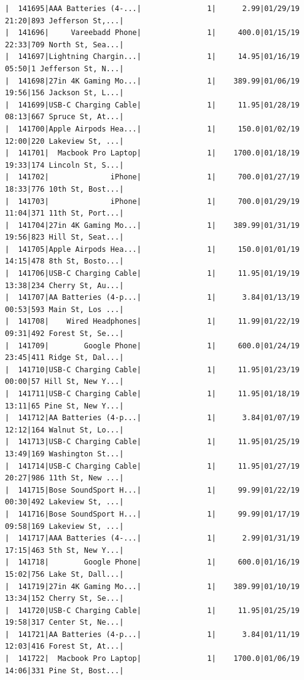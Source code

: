 \documentclass[
  letterpaper,
  DIV=11,
  numbers=noendperiod]{scrartcl}
\begin{document}
\begin{verbatim}
|  141695|AAA Batteries (4-...|               1|      2.99|01/29/19 21:20|893 Jefferson St,...|
|  141696|     Vareebadd Phone|               1|     400.0|01/15/19 22:33|709 North St, Sea...|
|  141697|Lightning Chargin...|               1|     14.95|01/16/19 05:50|1 Jefferson St, N...|
|  141698|27in 4K Gaming Mo...|               1|    389.99|01/06/19 19:56|156 Jackson St, L...|
|  141699|USB-C Charging Cable|               1|     11.95|01/28/19 08:13|667 Spruce St, At...|
|  141700|Apple Airpods Hea...|               1|     150.0|01/02/19 12:00|220 Lakeview St, ...|
|  141701|  Macbook Pro Laptop|               1|    1700.0|01/18/19 19:33|174 Lincoln St, S...|
|  141702|              iPhone|               1|     700.0|01/27/19 18:33|776 10th St, Bost...|
|  141703|              iPhone|               1|     700.0|01/29/19 11:04|371 11th St, Port...|
|  141704|27in 4K Gaming Mo...|               1|    389.99|01/31/19 19:56|823 Hill St, Seat...|
|  141705|Apple Airpods Hea...|               1|     150.0|01/01/19 14:15|478 8th St, Bosto...|
|  141706|USB-C Charging Cable|               1|     11.95|01/19/19 13:38|234 Cherry St, Au...|
|  141707|AA Batteries (4-p...|               1|      3.84|01/13/19 00:53|593 Main St, Los ...|
|  141708|    Wired Headphones|               1|     11.99|01/22/19 09:31|492 Forest St, Se...|
|  141709|        Google Phone|               1|     600.0|01/24/19 23:45|411 Ridge St, Dal...|
|  141710|USB-C Charging Cable|               1|     11.95|01/23/19 00:00|57 Hill St, New Y...|
|  141711|USB-C Charging Cable|               1|     11.95|01/18/19 13:11|65 Pine St, New Y...|
|  141712|AA Batteries (4-p...|               1|      3.84|01/07/19 12:12|164 Walnut St, Lo...|
|  141713|USB-C Charging Cable|               1|     11.95|01/25/19 13:49|169 Washington St...|
|  141714|USB-C Charging Cable|               1|     11.95|01/27/19 20:27|986 11th St, New ...|
|  141715|Bose SoundSport H...|               1|     99.99|01/22/19 00:30|492 Lakeview St, ...|
|  141716|Bose SoundSport H...|               1|     99.99|01/17/19 09:58|169 Lakeview St, ...|
|  141717|AAA Batteries (4-...|               1|      2.99|01/31/19 17:15|463 5th St, New Y...|
|  141718|        Google Phone|               1|     600.0|01/16/19 15:02|756 Lake St, Dall...|
|  141719|27in 4K Gaming Mo...|               1|    389.99|01/10/19 13:34|152 Cherry St, Se...|
|  141720|USB-C Charging Cable|               1|     11.95|01/25/19 19:58|317 Center St, Ne...|
|  141721|AA Batteries (4-p...|               1|      3.84|01/11/19 12:03|416 Forest St, At...|
|  141722|  Macbook Pro Laptop|               1|    1700.0|01/06/19 14:06|331 Pine St, Bost...|

\end{verbatim}
\end{document}
